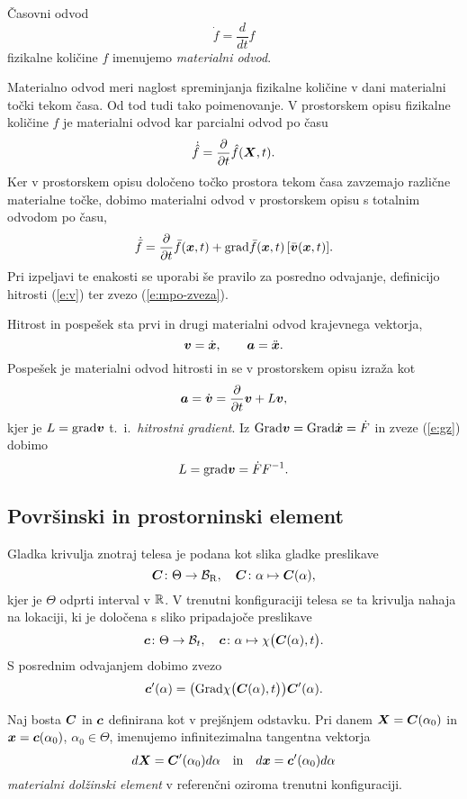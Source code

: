 \begin{definicija}
	Časovni odvod
	\[ \dot{f}=\frac{d}{dt}f \]
	fizikalne količine $f$ imenujemo \emph{materialni odvod}.
\end{definicija}
Materialno odvod meri naglost spreminjanja fizikalne količine v dani materialni točki tekom
časa. Od tod tudi tako poimenovanje. V prostorskem opisu fizikalne količine $f$ je materialni
odvod kar parcialni odvod po času
\[ \dot{\hat{f}}=\frac{\partial}{\partial t}\hat{f}(\boldsymbol X,t). \]
Ker v prostorskem opisu določeno točko prostora tekom časa zavzemajo različne
materialne točke, dobimo materialni odvod v prostorskem opisu s totalnim odvodom po času,
\[
	\dot{\bar{f}} = \frac{\partial}{\partial t}\bar{f}(\boldsymbol x,t) +
	\mathrm{grad} \bar{f}(\boldsymbol x,t)\,[\bar{\boldsymbol v}(\boldsymbol x,t)].
\]
Pri izpeljavi te enakosti se uporabi še pravilo za posredno odvajanje,
definicijo hitrosti (\ref{e:v}) ter zvezo (\ref{e:mpo-zveza}).
\begin{primer}
	Hitrost in pospešek sta prvi in drugi materialni odvod krajevnega vektorja,
	\[ \boldsymbol v=\dot{\boldsymbol x},\qquad \boldsymbol a=\ddot{\boldsymbol x}. \]
	Pospešek je materialni odvod hitrosti in se v prostorskem opisu izraža kot
	\[ \boldsymbol a=\dot{\boldsymbol v}=\frac{\partial}{\partial t}\boldsymbol v+L\boldsymbol v, \]
	kjer je $L=\mathrm{grad}\boldsymbol v$ t.~i.~\emph{hitrostni gradient}. Iz $\mathrm{Grad}\boldsymbol v=\mathrm{Grad}{\dot{\boldsymbol x}}=\dot{F}$ in
	zveze (\ref{e:gz}) dobimo
	\begin{equation} \label{e:L} L=\mathrm{grad}\boldsymbol v=\dot{F}F^{-1}. \end{equation}
\end{primer}


\subsection{Površinski in prostorninski element}


Gladka krivulja znotraj telesa je podana kot slika gladke preslikave
\[\boldsymbol C\colon \Theta\to\mathcal{B}_{\mathrm{R}}, \quad \boldsymbol C\colon\alpha\mapsto\boldsymbol C(\alpha),\]
kjer je $\Theta$ odprti interval v $\mathbb R$.
V trenutni konfiguraciji telesa se ta krivulja nahaja na lokaciji, ki je določena s sliko pripadajoče preslikave
\[ \boldsymbol c\colon \Theta\to\mathcal B_t,\quad \boldsymbol c\colon\alpha\mapsto\chi\big(\boldsymbol C(\alpha),t\big). \]
S posrednim odvajanjem dobimo zvezo
\begin{equation} \label{e:3101}
	\boldsymbol c'(\alpha) = \big( \mathrm{Grad}\chi\big(\boldsymbol C(\alpha),t\big)\big)\boldsymbol C'(\alpha).
\end{equation}
\begin{definicija}
	Naj bosta $\boldsymbol C$ in $\boldsymbol c$ definirana kot v prejšnjem odstavku.
	Pri danem $\boldsymbol X=\boldsymbol C(\alpha_0)$ in $\boldsymbol x=\boldsymbol c(\alpha_0)$, $\alpha_0\in\Theta$, imenujemo
	infinitezimalna tangentna vektorja
	\[ d\boldsymbol X=\boldsymbol C'(\alpha_0)d\alpha \quad \mathrm{in} \quad d\boldsymbol x=\boldsymbol c'(\alpha_0)d\alpha \]
	\emph{materialni dolžinski element} v referenčni oziroma trenutni konfiguraciji.
\end{definicija}

